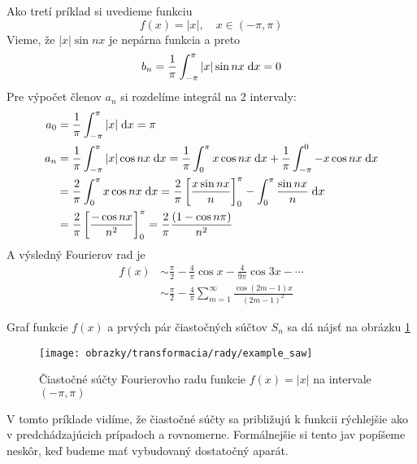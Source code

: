 \begin{priklad}
    Ako tretí príklad si uvedieme funkciu
    \begin{equation*}
        f(x) = |x|, \quad x\in(-\pi,\pi)
    \end{equation*}
    Vieme, že $|x| \sin nx$ je nepárna funkcia a preto
    \begin{equation*}
        b_n = \frac{1}{\pi} \int_{-\pi}^{\pi} |x| \sin nx \; \mathrm{d} x = 0
    \end{equation*}
    Pre výpočet členov $a_n$ si rozdelíme integrál na 2 intervaly:
    \begin{equation*}
    \begin{split}
        a_0 &= \frac{1}{\pi} \int_{-\pi}^{\pi} |x| \; \mathrm{d} x = \pi \\
        a_n &= \frac{1}{\pi} \int_{-\pi}^{\pi} |x| \cos nx \; \mathrm{d} x 
            = \frac{1}{\pi} \int_0^{\pi} x \cos nx \; \mathrm{d} x +
                \frac{1}{\pi} \int_{-\pi}^0 -x \cos nx \; \mathrm{d} x \\
            &= \frac{2}{\pi} \int_0^{\pi} x \cos nx \; \mathrm{d} x 
             = \frac{2}{\pi} \left[
                \frac{x \sin nx}{n}
                \right]_0^{\pi} -
                \int_0^{\pi} \frac{\sin nx}{n} \; \mathrm{d} x \\
            &= \frac{2}{\pi} \left[
                    \frac{-\cos nx}{n^2} \right]_0^\pi 
            = \frac{2}{\pi} \frac{(1-\cos n\pi)}{n^2}
    \end{split}
    \end{equation*}
    A výsledný Fourierov rad je
    \begin{equation*}
    \begin{split}
        f(x) &\sim \frac{\pi}{2} - \frac{4}{\pi} \cos x -
            \frac{4}{9\pi} \cos 3x - \cdots \\
            &\sim \frac{\pi}{2} - \frac{4}{\pi}
                \sum_{m=1}^{\infty} \frac{\cos(2m-1) x}{(2m-1)^2}            
    \end{split}
    \end{equation*}
    
    Graf funkcie $f(x)$ a prvých pár čiastočných súčtov $S_n$ sa dá
    nájsť na obrázku \ref{fig:example_saw}

    \begin{figure}[htp]
        \centering
        \texttt{[image: obrazky/transformacia/rady/example\_saw]}
        \caption{Čiastočné súčty Fourierovho radu funkcie $f(x)=|x|$ na
        intervale $(-\pi,\pi)$}
        \label{fig:example_saw}
    \end{figure}    
 V tomto príklade vidíme, že čiastočné súčty sa približujú k funkcii
 rýchlejšie ako v predchádzajúcich prípadoch a rovnomerne.
 Formálnejšie si tento jav popíšeme neskôr, keď budeme mať vybudovaný
 dostatočný aparát.
 \label{priklad:fourier_series_abs}
\end{priklad}

